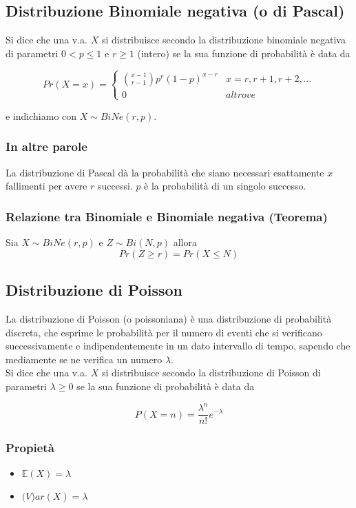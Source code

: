 \documentclass[a4paper]{report}
\begin{document}
  \subsection{Distribuzione Binomiale negativa (o di Pascal)}
  Si dice che una v.a. $X$ si distribuisce secondo la distribuzione binomiale negativa di parametri $0 < p \leqslant 1$ e $r \geq 1$ (intero) se la sua funzione di probabilità è data da

  \[
    Pr(X=x)=
      \begin{cases}
          \binom{x-1}{r-1} p^r (1-p)^{x-r} & x=r, r+1, r+2,\dots \\
          0 & altrove
      \end{cases}
  \]

  e indichiamo con $X \sim BiNe(r,p)$.

  \subsubsection{In altre parole}
  La distribuzione di Pascal dà la probabilità che siano necessari esattamente $x$ fallimenti per avere $r$ successi. $p$ è la probabilità di un singolo successo.

  \subsubsection{Relazione tra Binomiale e Binomiale negativa (Teorema)}
  Sia $X \sim BiNe(r,p)$ e $Z \sim Bi(N,p)$ allora
  \[ Pr(Z \geq r) = Pr(X \leqslant N) \]

  \subsection{Distribuzione di Poisson}
  La distribuzione di Poisson (o poissoniana) è una distribuzione di probabilità discreta, che esprime le probabilità per il numero di eventi che si verificano successivamente e indipendentemente in un dato intervallo di tempo, sapendo che mediamente se ne verifica un numero $\lambda$.\\
  Si dice che una v.a. $X$ si distribuisce secondo la distribuzione di Poisson di parametri $\lambda \geq 0$ se la sua funzione di probabilità è data da

  \[ P(X = n) = \frac{\lambda^n}{n!}e^{-\lambda} \]

  \subsubsection{Propietà}
  \begin{itemize}
    \item $\mathbb{E}(X) = \lambda $
    \item $ \mathbb(V)ar(X) = \lambda $
  \end{itemize}
\end{document}
